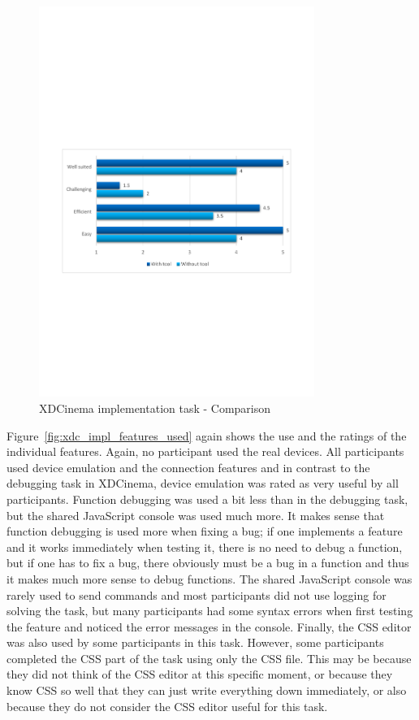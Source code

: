 \begin{figure}[H]
  \centering
    \includegraphics[width=0.8\textwidth]{images/charts/xdc_impl_comparison.pdf}
	\caption[xdc-impl: Comparison]{XDCinema implementation task - Comparison}
	\label{fig:xdc_impl_comparison}
\end{figure}

Figure~\ref{fig:xdc_impl_features_used} again shows the use and the ratings of the individual features. Again, no participant used the real devices. All participants used device emulation and the connection features and in contrast to the debugging task in XDCinema, device emulation was rated as very useful by all participants. Function debugging was used a bit less than in the debugging task, but the shared JavaScript console was used much more. It makes sense that function debugging is used more when fixing a bug; if one implements a feature and it works immediately when testing it, there is no need to debug a function, but if one has to fix a bug, there obviously must be a bug in a function and thus it makes much more sense to debug functions. The shared JavaScript console was rarely used to send commands and most participants did not use logging for solving the task, but many participants had some syntax errors when first testing the feature and noticed the error messages in the console. Finally, the CSS editor was also used by some participants in this task. However, some participants completed the CSS part of the task using only the CSS file. This may be because they did not think of the CSS editor at this specific moment, or because they know CSS so well that they can just write everything down immediately, or also because they do not consider the CSS editor useful for this task.

